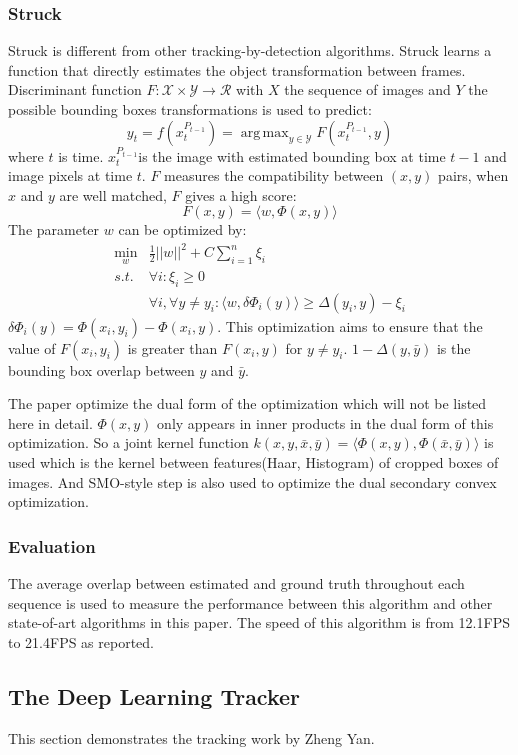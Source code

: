 \documentclass{acm_proc_article-sp}
\DeclareMathOperator*{\argmax}{arg\,max}
\DeclareMathOperator*{\minbelow}{min}
\begin{document}
\subsubsection{Struck}
Struck\cite{struck} is different from other tracking-by-detection algorithms. Struck learns a function that directly estimates the object transformation between frames. Discriminant function $F:\mathcal{X} \times \mathcal{Y} \to \mathcal{R}$ with $X$ the sequence of images and $Y$ the possible bounding boxes transformations is used to predict:
\[
y_t = f(x_t^{P_{t-1}}) = \argmax_{y\in \mathcal{Y}}F(x_t^{P_{t-1}},y)
\]
where $t$ is time. $x_t^{P_{t-1}}$is the image with estimated bounding box at time $t-1$ and image pixels at time $t$. $F$ measures the compatibility between $(x,y)$ pairs, when $x$ and $y$ are well matched, $F$ gives a high score:
\[
F(x,y)=\langle w, \Phi(x,y) \rangle
\]
The parameter $w$ can be optimized by:
\begin{align}
\minbelow_w	&\frac{1}{2}||w||^2 + C \sum_{i=1}^n\xi_i\nonumber\\
	s.t.	&\forall i: \xi_i \ge 0\nonumber\\
			&\forall i, \forall y\not= y_i : \langle w, \delta\Phi_i(y)\rangle \ge \Delta(y_i,y)-\xi_i
\end{align}
$\delta\Phi_i(y)=\Phi(x_i, y_i) - \Phi(x_i, y)$. This optimization aims to ensure that the value of $F(x_i, y_i)$ is greater than $F(x_i, y)$ for $y\not= y_i$. $1-\Delta(y,\bar{y})$ is the bounding box overlap between $y$ and $\bar{y}$.

The paper optimize the dual form of the optimization which will not be listed here in detail. $\Phi(x,y)$ only appears in inner products in the dual form of this optimization. So a joint kernel function $k(x,y,\bar{x},\bar{y}) = \langle \Phi(x,y), \Phi(\bar{x},\bar{y})\rangle$ is used which is the kernel between features(Haar, Histogram) of cropped boxes of images. And SMO-style step is also used to optimize the dual secondary convex optimization.

\subsubsection{Evaluation}
The average overlap between estimated and ground truth throughout each sequence is used to measure the performance between this algorithm and other state-of-art algorithms in this paper.
The speed of this algorithm is from 12.1FPS to 21.4FPS as reported.


\subsection{The Deep Learning Tracker}
This section demonstrates the tracking work by Zheng Yan.
\end{document}

